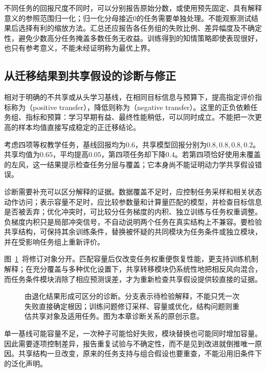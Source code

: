 不同任务的回报尺度不同时，可以分别报告原始分数，或使用预先固定、具有解释意义的参照范围归一化；归一化分母接近0的任务需要单独处理。不能观察测试结果后选择有利的缩放方法。汇总还应报告各任务组的失败比例、差异幅度及不确定性，避免少数高分任务掩盖多数任务无收益。训练得到的知情策略即使表现很好，也只有参考意义，不能未经证明称为最优上界。

\subsection{从迁移结果到共享假设的诊断与修正}
\label{sec:rl-transfer-diagnosis}

相对于明确的不共享或从头学习基线，在相同目标信息与预算下，提高指定评价指标称为（positive transfer），降低则称为（negative transfer）。这里的正负依赖任务组、指标和预算：学习早期有益、最终性能稍低，可以同时成立。不能把一次更高的样本均值直接写成稳定的正迁移结论。

考虑四项等权教学任务，基线回报均为$0.6$，共享模型回报分别为$0.8,0.8,0.8,0.2$。共享均值为$0.65$，平均提高$0.05$，第四项任务却下降$0.4$。若第四项恰好使用未覆盖的左风，这一结果提示检查任务分层与覆盖；它本身尚不能证明动力学共享假设错误。

诊断需要补充可以区分解释的证据。数据覆盖不足时，应控制任务采样和相关状态动作访问；表示容量不足时，应比较参数量和计算量匹配的模型，并检查目标信息是否被丢弃；优化冲突时，可比较分任务梯度的内积、独立训练与任务权重调整。负梯度内积只是局部冲突信号，不自动说明两个任务在真实结构上不兼容。要检验共享结构，可保持其余训练条件，替换被怀疑的共同模块为任务条件或独立模块，并在受影响任务组上重新评价。

图~\ref{fig:rl-transfer-diagnosis}~将修订对象分开。匹配容量后仅改变任务权重便恢复性能，更支持训练机制解释；在充分覆盖与多种优化设置下，共享转移模块仍系统性地把相反风向混合，而任务条件模块消除了相应预测误差，才为重新检查共享假设提供较直接的证据。

\begin{figure}[htbp]
 \centering
 
 \caption{由退化结果形成可区分的诊断。分支表示待检验解释，不能只凭一次失败直接确定根因；训练问题修订采样、容量或优化，结构问题则重估共享对象及适用任务。图为本章诊断关系的原创示意。}
 \label{fig:rl-transfer-diagnosis}
\end{figure}

单一基线可能容量不足，一次种子可能恰好失败，模块替换也可能同时增加容量。因此需要逐项控制差异，报告重复试验与不确定性，而不是见到改进就倒推唯一原因。共享结构一旦改变，原来的任务支持与组合假设也要重查，不能沿用旧条件下的泛化声明。

